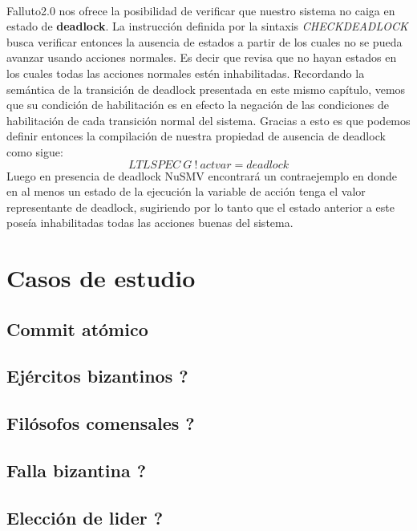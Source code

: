 \documentclass[titlepage, 12pt]{book}
\begin{document}
~\\

Falluto2.0 nos ofrece la posibilidad de verificar que nuestro sistema no caiga en estado de \textbf{deadlock}. La instrucci\'on definida por la sintaxis \textit{CHECKDEADLOCK} busca verificar entonces la ausencia de estados a partir de los cuales no se pueda avanzar usando acciones normales. Es decir que revisa que no hayan estados en los cuales todas las acciones normales est\'en inhabilitadas. Recordando la sem\'antica de la transici\'on de deadlock presentada en este mismo cap\'itulo, vemos que su condici\'on de habilitaci\'on es en efecto la negaci\'on de las condiciones de habilitaci\'on de cada transici\'on normal del sistema. Gracias a esto es que podemos definir entonces la compilaci\'on de nuestra propiedad de ausencia de deadlock como sigue:
$$LTLSPEC~G~!~actvar = deadlock$$
Luego en presencia de deadlock NuSMV encontrar\'a un contraejemplo en donde en al menos un estado de la ejecuci\'on la variable de acci\'on tenga el valor representante de deadlock, sugiriendo por lo tanto que el estado anterior a este pose\'ia inhabilitadas todas las acciones buenas del sistema.





\chapter{Casos de estudio}

\section{Commit at\'omico}



			\section{Ej\'ercitos bizantinos ?}
			\section{Fil\'osofos comensales ?}
			\section{Falla bizantina ?}
			\section{Elecci\'on de lider ?}
\end{document}
